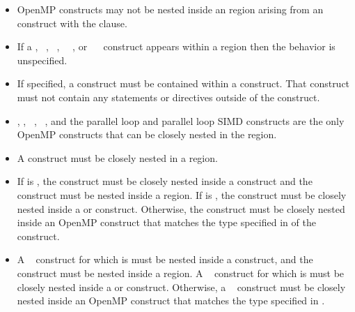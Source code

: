 \begin{itemize}
\item OpenMP constructs may not be nested inside an  region
arising from an  construct with the  clause.

\item If a , ~, ~,
~~, or ~~ construct appears
within a  region then the behavior is unspecified. 

\item If specified, a  construct must be contained within a  construct. That 
 construct must not contain any statements or directives outside of the  
construct. 

\item {}, , ~, ~, and 
the parallel loop and parallel loop SIMD constructs are the only OpenMP constructs 
that can be closely nested in the  region. 

\item A  construct must be closely nested in a  region. 

\item If  is , the 
construct must be closely nested inside a  construct and the
 construct must be nested inside a  region.
If  is , the 
construct must be closely nested inside a  or 
construct. Otherwise, the  construct must be closely nested
inside an OpenMP construct that matches the type specified in
 of the  construct.

\item A ~ construct for which
 is  must be nested inside
a  construct, and the ~ construct
must be nested inside a  region. A
~ construct for which
 is  must be closely nested
inside a  or  construct. Otherwise, a
~ construct must be closely nested inside
an OpenMP construct that matches the type specified in
.
\end{itemize}



